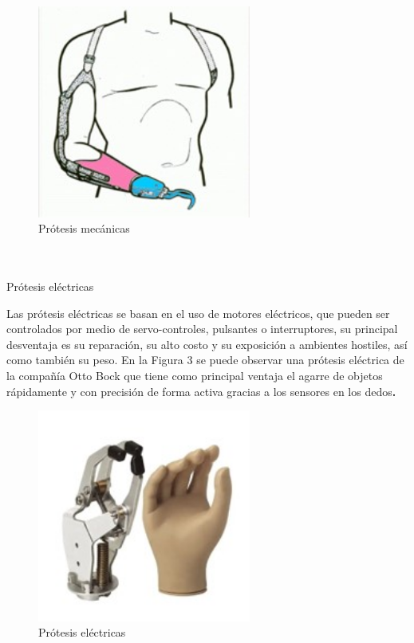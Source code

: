 \documentclass{article}
\begin{document}
\begin{description}
\begin{description}
\begin{figure} [htp]%
    \centering
    \includegraphics[width=70mm]{imagen3.jpg} %
    \caption{Prótesis mecánicas}
    \label{grafica}
\end{figure}
\\
\\

{Prótesis eléctricas} \\
\item Las prótesis eléctricas se basan en el uso de motores eléctricos, que pueden ser controlados por medio de servo-controles, pulsantes o interruptores, su principal desventaja es su reparación, su alto costo y su exposición a ambientes hostiles, así como también su peso. En la Figura 3 se puede observar una prótesis eléctrica de la compañía Otto Bock que tiene como principal ventaja el agarre de objetos rápidamente y con precisión de forma activa gracias a los sensores en los dedos\cite{ff2}\textbf.\\

\begin{figure} [htp]%
    \centering
    \includegraphics[width=70mm]{imagen4.jpg} %
    \caption{Prótesis eléctricas}
    \label{grafica}
\end{figure}


\end{description}
\end{description}
\end{document}
